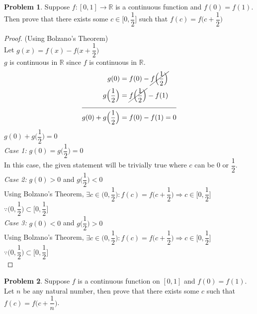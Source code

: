\documentclass[14]{article}
\theoremstyle{definition}
\newtheorem{prob}{Problem}
\begin{document}
\begin{prob}
Suppose $f:[0, 1] \to \mathbb{R}$ is a continuous function and $f(0) = f(1)$. Then prove that there exists some $c \in \Big[0, \dfrac{1}{2}\Big]$ such that $f(c) = f\Big(c + \dfrac{1}{2}\Big)$
\begin{proof} (Using Bolzano's Theorem)\\
Let $g(x) = f(x) - f\Big(x + \dfrac{1}{2}\Big)$\\
$g$ is continuous in $\mathbb{R}$ since $f$ is continuous in $\mathbb{R}$.\\
\begin{align}
g(0) &= f(0) - \cancel{f\Big(\dfrac{1}{2}\Big)}\\
g\Big(\dfrac{1}{2}\Big) &= \cancel{f\Big(\dfrac{1}{2}\Big)} - f(1)\\
\cline{1-2}
g(0)+g\Big(\dfrac{1}{2}\Big) &= f(0) - f(1) = 0
\end{align}
$g(0)+g\Big(\dfrac{1}{2}\Big) = 0$\\
\textit{Case 1:} $g(0)=g\Big(\dfrac{1}{2}\Big) = 0$\\
In this case, the given statement will be trivially true where $c$ can be $0$ or $\dfrac{1}{2}$.\\
\textit{Case 2:} $g(0) > 0$ and $g\Big(\dfrac{1}{2}\Big) < 0$\\
Using Bolzano's Theorem, $\exists c \in \Big(0, \dfrac{1}{2}\Big) : f(c) = f\Big(c + \dfrac{1}{2}\Big) \Rightarrow c \in \Big[0, \dfrac{1}{2}\Big]\;\;\;\;\;\;\;\;\;\;$ $\because \Big(0, \dfrac{1}{2}\Big) \subset \Big[0, \dfrac{1}{2}\Big] $\\
\textit{Case 3:} $g(0) < 0$ and $g\Big(\dfrac{1}{2}\Big) > 0$\\
Using Bolzano's Theorem, $\exists c \in \Big(0, \dfrac{1}{2}\Big) : f(c) = f\Big(c + \dfrac{1}{2}\Big) \Rightarrow c \in \Big[0, \dfrac{1}{2}\Big]\;\;\;\;\;\;\;\;\;\;$ $\because \Big(0, \dfrac{1}{2}\Big) \subset \Big[0, \dfrac{1}{2}\Big] $\\
\end{proof}
\end{prob}
\pagebreak
\begin{prob}
Suppose $f$ is a continuous function on $[0, 1]$ and $f(0) = f(1)$. Let $n$ be any natural number, then prove that there exists some $c$ such that $f(c) = f\Big(c + \dfrac{1}{n}\Big)$.
\end{prob}
\end{document}
